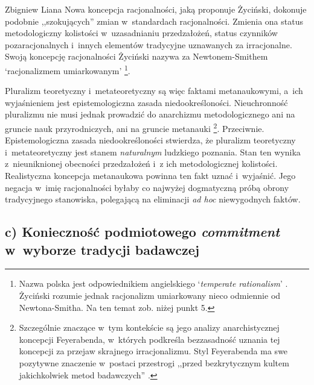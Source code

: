 \begin{artplenv}{Zbigniew Liana}
Nowa koncepcja racjonalności, jaką proponuje Życiński, dokonuje podobnie ,,szokujących'' zmian w~standardach racjonalności. Zmienia ona status metodologiczny kolistości w~uzasadnianiu przedzałożeń, status czynników pozaracjonalnych i~innych elementów tradycyjne uznawanych za irracjonalne. Swoją koncepcję racjonalności Życiński nazywa za Newtonem-Smithem ‘racjonalizmem umiarkowanym'
\parencite[][s.~205]{zycinski_teizm_1985}%
\footnote{Nazwa polska jest odpowiednikiem angielskiego `\textit{temperate rationalism}' 
\parencite[][s.~266–273]{newton-smith_rationality_1981}. %
 Życiński rozumie jednak racjonalizm umiarkowany nieco odmiennie od Newtona-Smitha. Na ten temat zob. niżej punkt 5.}.

Pluralizm teoretyczny i~metateoretyczny są więc faktami metanaukowymi, a~ich wyjaśnieniem jest epistemologiczna zasada niedookreśloności. Nieuchronność pluralizmu nie musi jednak prowadzić do anarchizmu metodologicznego ani na gruncie nauk przyrodniczych, ani na gruncie metanauki
\parencites[zob. np.][s.~183nn]{zycinski_jezyk_1983}[][s.~161n.203nn]{zycinski_teizm_1985}%
\footnote{Szczególnie znaczące w~tym kontekście są jego analizy anarchistycznej koncepcji Feyerabenda, w~których podkreśla bezzasadność uznania tej koncepcji za przejaw skrajnego irracjonalizmu. Styl Feyerabenda ma swe pozytywne znaczenie w~postaci przestrogi ,,przed bezkrytycznym kultem jakichkolwiek metod badawczych'' 
\parencites[zob.][s.~217–227, zwł. s.~220]{zycinski_elementy_1996}[][s.~295–308, zwł. s.~299n]{zycinski_elementy_2015}.%
}. Przeciwnie. Epistemologiczna zasada niedookreśloności stwierdza, że pluralizm teoretyczny i~metateoretyczny jest stanem \textit{naturalnym} ludzkiego poznania. Stan ten wynika z~nieuniknionej obecności przedzałożeń i~z ich metodologicznej kolistości. Realistyczna koncepcja metanaukowa powinna ten fakt uznać i~wyjaśnić. Jego negacja w~imię racjonalności byłaby co najwyżej dogmatyczną próbą obrony tradycyjnego stanowiska, polegającą na eliminacji \textit{ad hoc} niewygodnych faktów.

\subsection{c) Konieczność podmiotowego \textit{commitment} w~wyborze tradycji badawczej}


\end{artplenv}
